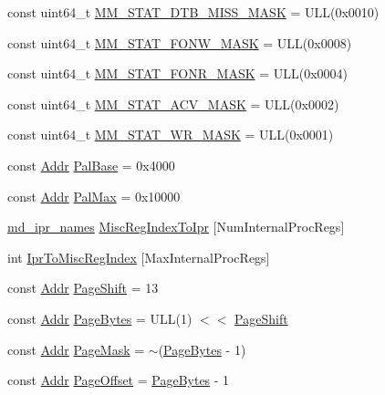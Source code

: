 \begin{DoxyCompactItemize}
\item 
const uint64\_\-t \hyperlink{namespaceAlphaISA_ad307c833a813184d15a18a5063358916}{MM\_\-STAT\_\-DTB\_\-MISS\_\-MASK} = ULL(0x0010)
\item 
const uint64\_\-t \hyperlink{namespaceAlphaISA_a0bd71744e6a29780f244bc897291ca57}{MM\_\-STAT\_\-FONW\_\-MASK} = ULL(0x0008)
\item 
const uint64\_\-t \hyperlink{namespaceAlphaISA_aab1a75bed1961a122e6bb731b866cf27}{MM\_\-STAT\_\-FONR\_\-MASK} = ULL(0x0004)
\item 
const uint64\_\-t \hyperlink{namespaceAlphaISA_a0affe5a0a033bf0f88646d2f683935be}{MM\_\-STAT\_\-ACV\_\-MASK} = ULL(0x0002)
\item 
const uint64\_\-t \hyperlink{namespaceAlphaISA_a305c800386d962542fb4c74e5961121f}{MM\_\-STAT\_\-WR\_\-MASK} = ULL(0x0001)
\item 
const \hyperlink{classm5_1_1params_1_1Addr}{Addr} \hyperlink{namespaceAlphaISA_a472839c7f0afafca3f4e2d5dd2179ab2}{PalBase} = 0x4000
\item 
const \hyperlink{classm5_1_1params_1_1Addr}{Addr} \hyperlink{namespaceAlphaISA_abc996cfd68e764265e505f2904723667}{PalMax} = 0x10000
\item 
\hyperlink{namespaceAlphaISA_a0cd208652efde0d49b6a875aea151470}{md\_\-ipr\_\-names} \hyperlink{namespaceAlphaISA_a85596e9220b88ac7b8d5045e67e0c8d9}{MiscRegIndexToIpr} \mbox{[}NumInternalProcRegs\mbox{]}
\item 
int \hyperlink{namespaceAlphaISA_a8e41b21abec90c022e4c8c9f8b7a1e2e}{IprToMiscRegIndex} \mbox{[}MaxInternalProcRegs\mbox{]}
\item 
const \hyperlink{classm5_1_1params_1_1Addr}{Addr} \hyperlink{namespaceAlphaISA_a6eacddc1d6d191380d9afdac5920ea48}{PageShift} = 13
\item 
const \hyperlink{classm5_1_1params_1_1Addr}{Addr} \hyperlink{namespaceAlphaISA_ad9d6a4d965e107c9a7214f096107296b}{PageBytes} = ULL(1) $<$$<$ \hyperlink{namespaceAlphaISA_a6eacddc1d6d191380d9afdac5920ea48}{PageShift}
\item 
const \hyperlink{classm5_1_1params_1_1Addr}{Addr} \hyperlink{namespaceAlphaISA_acd1e88c82c4d48223a490f4d235ced74}{PageMask} = $\sim$(\hyperlink{namespaceAlphaISA_ad9d6a4d965e107c9a7214f096107296b}{PageBytes} -\/ 1)
\item 
const \hyperlink{classm5_1_1params_1_1Addr}{Addr} \hyperlink{namespaceAlphaISA_a51e1064f1269394dc26702651be5061f}{PageOffset} = \hyperlink{namespaceAlphaISA_ad9d6a4d965e107c9a7214f096107296b}{PageBytes} -\/ 1
\item 
$$
\end{DoxyCompactItemize}
